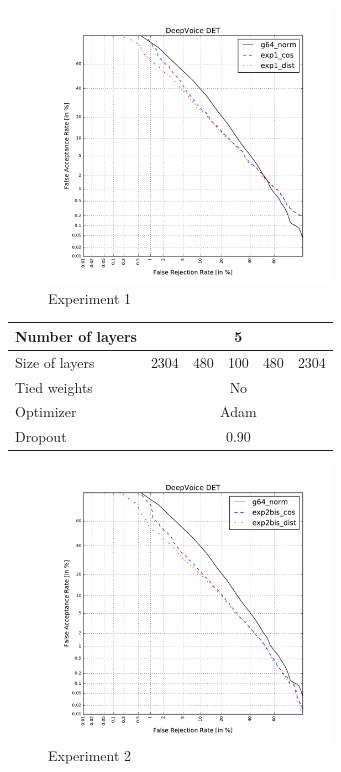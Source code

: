 \documentclass[conference]{IEEEtran}
\begin{document}
\begin{figure}[!h]
    \centering
    \includegraphics[width=7.5cm]{../scores/det1.pdf}
    \captionsetup{labelformat=empty}
    \caption{Experiment 1}
\end{figure}


\newpage

\begin{table}[!h]
\centering
\begin{tabular}{|l|c|c|c|c|c|}
\hline
Number of layers & \multicolumn{5}{c|}{5}                \\ \hline
Size of layers   & 2304   & 480   & 100  & 480  & 2304   \\ \hline
Tied weights     & \multicolumn{5}{c|}{No}               \\ \hline
Optimizer        & \multicolumn{5}{c|}{Adam} \\ \hline
Dropout          & \multicolumn{5}{c|}{0.90} \\ \hline
\end{tabular}
\end{table}


\begin{figure}[!h]
    \centering
    \includegraphics[width=7.5cm]{../scores/det2bis.pdf}
    \captionsetup{labelformat=empty}
    \caption{Experiment 2}
\end{figure}
\end{document}
